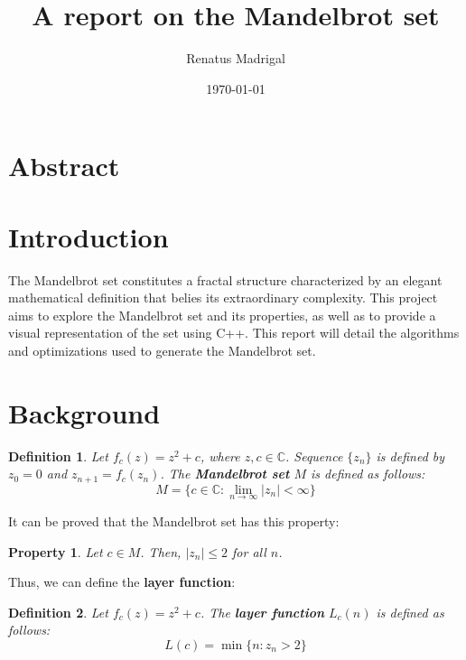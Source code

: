 \documentclass[11pt]{article}
\title{A report on the Mandelbrot set}
\author{Renatus Madrigal}
\date{\today}
\newtheorem{definition}{Definition}
\newtheorem{property}{Property}
\begin{document}
    \maketitle


    \section{Abstract}\label{sec:abstract}


    \section{Introduction}\label{sec:introduction}

    The Mandelbrot set constitutes a fractal structure characterized by an elegant mathematical definition that belies
    its extraordinary complexity.
    This project aims to explore the Mandelbrot set and its properties, as well as to provide a visual representation of
    the set using C++.
    This report will detail the algorithms and optimizations used to generate the Mandelbrot set.


    \section{Background}\label{sec:background}

    \begin{definition}
        Let $f_c(z) = z^2 + c$, where $z, c \in \mathbb{C}$.
        Sequence $\{z_n\}$ is defined by $z_0 = 0$ and $z_{n+1} = f_c(z_n)$.
        The \textbf{Mandelbrot set} $M$ is defined as follows:
        \begin{equation}
            M = \{c \in \mathbb{C} : \lim_{n \to \infty} |z_n| < \infty\}\label{eq:mandelbrot_set_define}
        \end{equation}
    \end{definition}

    It can be proved\textsuperscript{\cite{branner1989mandelbrot}} that the Mandelbrot set has this property:

    \begin{property}
        \label{prop:bounded}
        Let $c \in M$.
        Then, $|z_n| \leq 2$ for all $n$.
    \end{property}

    Thus, we can define the \textbf{layer function}:

    \begin{definition}
        Let $f_c(z) = z^2 + c$.
        The \textbf{layer function} $L_c(n)$ is defined as follows:
        \begin{equation}
            L(c) = \min\{n : z_n > 2\}\label{eq:layer_function}
        \end{equation}
    \end{definition}
\end{document}
